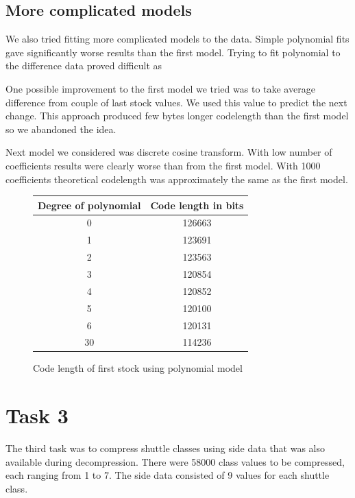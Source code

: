 \documentclass{article}
\begin{document}
\subsection {More complicated models}
We also tried fitting more complicated models to the data.
Simple polynomial fits gave significantly worse results than the first model.
Trying to fit polynomial to the difference data proved difficult as

One possible improvement to the first model we tried was to take average difference
from couple of last stock values. We used this value to predict the next change.
This approach produced few bytes longer codelength than the first model so we
abandoned the idea.

Next model we considered was discrete cosine transform.
With low number of coefficients results were clearly worse than from the first model.
With 1000 coefficients theoretical codelength was approximately the same as the first model.

\begin{figure}
\begin{center}
\begin{tabular}{|c|c|}
\hline
    Degree of polynomial & Code length in bits\\ \hline
    0      & 126663 \\  \hline
    1      & 123691 \\ \hline
    2      & 123563 \\ \hline
    3      & 120854 \\ \hline
    4      & 120852 \\ \hline
    5      & 120100 \\ \hline
    6      & 120131 \\ \hline
    30     & 114236 \\ \hline
\end{tabular}
\end{center}
\caption{Code length of first stock using polynomial model}
\label{ex2_polys}
\end{figure}

\section{Task 3}

The third task was to compress shuttle classes using side data that was also available during decompression.
There were 58000 class values to be compressed, each ranging from 1 to 7.
The side data consisted of 9 values for each shuttle class.
\end{document}
